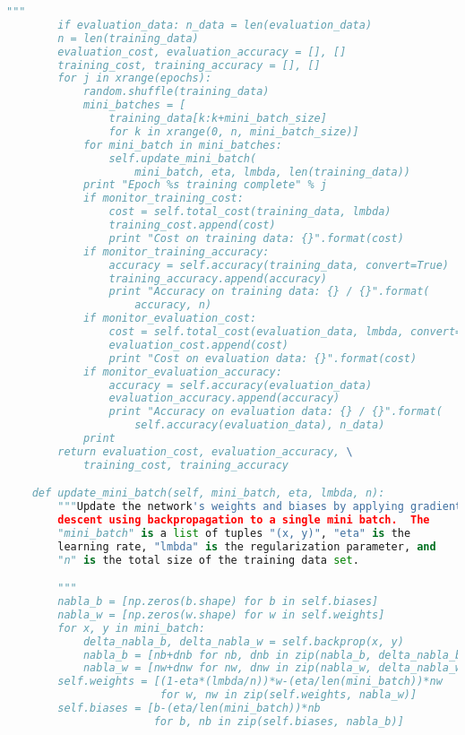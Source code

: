 \begin{fullwidth}
\begin{lstlisting}[caption={network2.py (Python 2.7)},label={lst:network2.py}, language=Python]
        """
        if evaluation_data: n_data = len(evaluation_data)
        n = len(training_data)
        evaluation_cost, evaluation_accuracy = [], []
        training_cost, training_accuracy = [], []
        for j in xrange(epochs):
            random.shuffle(training_data)
            mini_batches = [
                training_data[k:k+mini_batch_size]
                for k in xrange(0, n, mini_batch_size)]
            for mini_batch in mini_batches:
                self.update_mini_batch(
                    mini_batch, eta, lmbda, len(training_data))
            print "Epoch %s training complete" % j
            if monitor_training_cost:
                cost = self.total_cost(training_data, lmbda)
                training_cost.append(cost)
                print "Cost on training data: {}".format(cost)
            if monitor_training_accuracy:
                accuracy = self.accuracy(training_data, convert=True)
                training_accuracy.append(accuracy)
                print "Accuracy on training data: {} / {}".format(
                    accuracy, n)
            if monitor_evaluation_cost:
                cost = self.total_cost(evaluation_data, lmbda, convert=True)
                evaluation_cost.append(cost)
                print "Cost on evaluation data: {}".format(cost)
            if monitor_evaluation_accuracy:
                accuracy = self.accuracy(evaluation_data)
                evaluation_accuracy.append(accuracy)
                print "Accuracy on evaluation data: {} / {}".format(
                    self.accuracy(evaluation_data), n_data)
            print
        return evaluation_cost, evaluation_accuracy, \
            training_cost, training_accuracy

    def update_mini_batch(self, mini_batch, eta, lmbda, n):
        """Update the network's weights and biases by applying gradient
        descent using backpropagation to a single mini batch.  The
        "mini_batch" is a list of tuples "(x, y)", "eta" is the
        learning rate, "lmbda" is the regularization parameter, and
        "n" is the total size of the training data set.

        """
        nabla_b = [np.zeros(b.shape) for b in self.biases]
        nabla_w = [np.zeros(w.shape) for w in self.weights]
        for x, y in mini_batch:
            delta_nabla_b, delta_nabla_w = self.backprop(x, y)
            nabla_b = [nb+dnb for nb, dnb in zip(nabla_b, delta_nabla_b)]
            nabla_w = [nw+dnw for nw, dnw in zip(nabla_w, delta_nabla_w)]
        self.weights = [(1-eta*(lmbda/n))*w-(eta/len(mini_batch))*nw
                        for w, nw in zip(self.weights, nabla_w)]
        self.biases = [b-(eta/len(mini_batch))*nb
                       for b, nb in zip(self.biases, nabla_b)]


\end{lstlisting}
\end{fullwidth}
